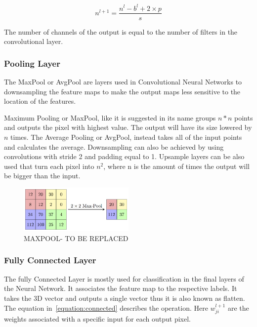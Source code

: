 \begin{equation} \label{equation:padding}
     n^{l+1} = \frac{n^{l}- b^{l}+2 \times p}{s}
\end{equation}

The number of channels of the output is equal to the number of filters in the
convolutional layer.



\subsubsection{Pooling Layer}

The MaxPool or AvgPool are layers used in Convolutional Neural Networks to
downsampling the feature maps to make the output maps less sensitive to the
location of the features.

Maximum Pooling or MaxPool, like it is suggested in its name groups $ n * n $
points and outputs the pixel with highest value.  The output will have its size
lowered by $ n $ times.  The Average Pooling or AvgPool, instead takes all of
the input points and calculates the average. Downsampling can also be achieved
by using convolutions with stride 2 and padding equal to 1.  Upsample layers can
be also used that turn each pixel into $ n^{2} $, where n is the amount of times
the output will be bigger than the input.

\begin{figure}[!htbp]
    \centering
    \includegraphics[width=0.5\textwidth]{Figures/maxpool.png}
    \caption{MAXPOOL- TO BE REPLACED}
    \label{figure:maxpool}
\end{figure} 
 

\subsubsection{Fully Connected Layer}

The fully Connected Layer is mostly used for classification in the final layers
of the Neural Network. It associates the feature map to the respective labels.
It takes the 3D vector and outputs a single vector thus it is also known as
flatten.  The equation in~\ref{equation:connected} describes the operation. Here
$w_{ji}^{l+1}$ are the weights associated with a specific input for each output
pixel.



